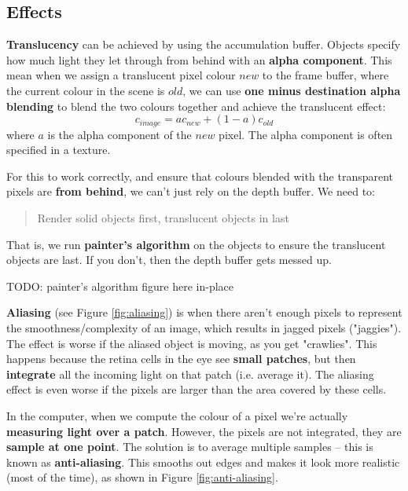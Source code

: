 \documentclass{article}
\begin{document}
\subsection{Effects}

\textbf{Translucency} can be achieved by using the accumulation buffer. Objects specify how much light they let through from behind with an \textbf{alpha component}. This mean when we assign a translucent pixel colour $new$ to the frame buffer, where the current colour in the scene is $old$, we can use \textbf{one minus destination alpha blending} to blend the two colours together and achieve the translucent effect:
\begin{equation}
	c_{image} = a c_{new} + (1 - a)c_{old}
\end{equation}
where $a$ is the alpha component of the $new$ pixel. The alpha component is often specified in a texture.

For this to work correctly, and ensure that colours blended with the transparent pixels are \textbf{from behind}, we can't just rely on the depth buffer. We need to:
\begin{quote}
	Render solid objects first, translucent objects in last
\end{quote}
That is, we run \textbf{painter's algorithm} on the objects to ensure the translucent objects are last. If you don't, then the depth buffer gets messed up. 

TODO: painter's algorithm figure here in-place

\textbf{Aliasing} (see Figure \ref{fig:aliasing}) is when there aren't enough pixels to represent the smoothness/complexity of an image, which results in jagged pixels ("jaggies"). The effect is worse if the aliased object is moving, as you get "crawlies". This happens because the retina cells in the eye see \textbf{small patches}, but then \textbf{integrate} all the incoming light on that patch (i.e. average it). The aliasing effect is even worse if the pixels are larger than the area covered by these cells.

In the computer, when we compute the colour of a pixel we're actually \textbf{measuring light over a patch}. However, the pixels are not integrated, they are \textbf{sample at one point}. The solution is to average multiple samples -- this is known as \textbf{anti-aliasing}. This smooths out edges and makes it look more realistic (most of the time), as shown in Figure \ref{fig:anti-aliasing}.
\end{document}
